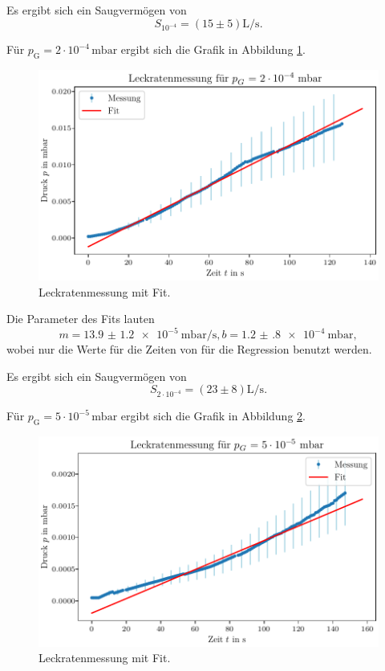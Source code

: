 Es ergibt sich ein Saugvermögen von
\begin{equation}
    S_{10^{-4}} = (\num{15} \pm \num{5}) \si{\liter\per\second}.
\end{equation}

Für $p_\text{G} = 2 \cdot 10^{-4} \, \si{\milli\bar}$ ergibt sich die Grafik in Abbildung \ref{fig:TP_Leck_2e4}.

\begin{figure}[H]
    \centering
    \includegraphics[width=\textwidth]{plots/TP_Leck_2e4.pdf}
    \caption{Leckratenmessung mit Fit.}
    \label{fig:TP_Leck_2e4}
\end{figure}

Die Parameter des Fits lauten 
\begin{equation}
    m = \qty{13.9(12)e-5}{\milli\bar\per\second}, b = \qty{1.2(8)e-4}{\milli\bar},
\end{equation}
wobei nur die Werte für die Zeiten von %
für die Regression benutzt werden.

Es ergibt sich ein Saugvermögen von
\begin{equation}
    S_{2 \cdot 10^{-4}} = (\num{23} \pm \num{8}) \si{\liter\per\second}.
\end{equation}

Für $p_\text{G} = 5 \cdot 10^{-5} \, \si{\milli\bar}$ ergibt sich die Grafik in Abbildung \ref{fig:TP_Leck_5e5}.

\begin{figure}[H]
    \centering
    \includegraphics[width=\textwidth]{plots/TP_Leck_5e5.pdf}
    \caption{Leckratenmessung mit Fit.}
    \label{fig:TP_Leck_5e5}
\end{figure}

